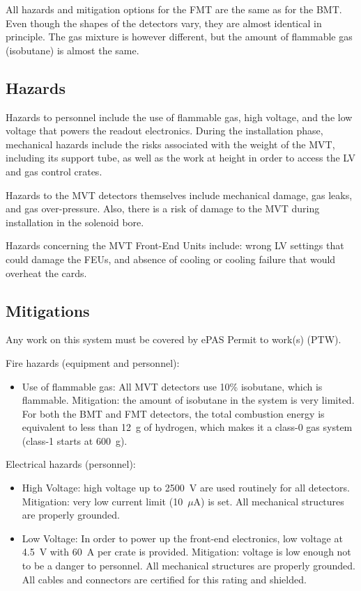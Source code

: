 All hazards and mitigation options for the FMT are the same as for the BMT. Even though the 
shapes of the detectors vary, they are almost identical in principle. The gas mixture is 
however different, but the amount of flammable gas (isobutane) is almost the same.

\subsection{Hazards} 

Hazards to personnel include the use of flammable gas, high voltage, and the low voltage that 
powers the readout electronics. During the installation phase, mechanical hazards include the 
risks associated with the weight of the MVT, including its support tube, as well as the work at 
height in order to access the LV and gas control crates.

Hazards to the MVT detectors themselves include mechanical damage, gas leaks, and gas 
over-pressure. Also, there is a risk of damage to the MVT during installation in the solenoid 
bore.

Hazards concerning the MVT Front-End Units include: wrong LV settings that could damage the FEUs, 
and absence of cooling or cooling failure that would overheat the cards.

\subsection{Mitigations}
Any work on this system must be covered by ePAS Permit to work(s) (PTW).

Fire hazards (equipment and personnel):
\begin{itemize}
\item Use of flammable gas: All MVT detectors use 10\% isobutane, which is flammable. Mitigation: 
the amount of isobutane in the system is very limited. For both the BMT and FMT detectors, the 
total combustion energy is equivalent to less than 12~g of hydrogen, which makes it a class-0 
gas system (class-1 starts at 600~g).
\end{itemize}

Electrical hazards (personnel):
\begin{itemize}
\item High Voltage: high voltage up to 2500~V are used routinely for all detectors. Mitigation: 
very low current limit (10~$\mu$A) is set. All mechanical structures are properly grounded.
\item Low Voltage: In order to power up the front-end electronics, low voltage at 4.5~V 
with 60~A per crate is provided. Mitigation: voltage is low enough not to be a danger to personnel. All 
mechanical structures are properly grounded. All cables and connectors are certified for this 
rating and shielded.
\end{itemize}

